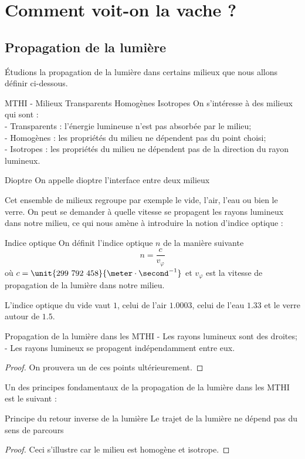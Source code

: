 \documentclass{cours}
\begin{document}
	\section{Comment voit-on la vache ?}
	\subsection{Propagation de la lumière}
	Étudions la propagation de la lumière dans certains milieux que nous allons définir ci-dessous.
	\begin{définition}{MTHI - Milieux Transparents Homogènes Isotropes}{}
	On s'intéresse à des milieux qui sont :\\
	- Transparents : l'énergie lumineuse n'est pas absorbée par le milieu;\\
	- Homogènes : les propriétés du milieu ne dépendent pas du point choisi;\\
	- Isotropes : les propriétés du milieu ne dépendent pas de la direction du rayon lumineux.
	\end{définition}
	\begin{définition}{Dioptre}{}
	On appelle dioptre l'interface entre deux milieux
	\end{définition}
	Cet ensemble de milieux regroupe par exemple le vide, l'air, l'eau ou bien le verre. On peut se demander à quelle vitesse se propagent les rayons lumineux dans notre milieu, ce qui nous amène à introduire la notion d'indice optique :
	\begin{définition}{Indice optique}{}
	On définit l'indice optique $n$ de la manière suivante
	$$n=\frac{c}{v_\varphi}$$
	où $c =\unit{299~792~458}{\meter\cdot\second^{-1}}$ et $v_\varphi$ est la vitesse de propagation de la lumière dans notre milieu.
	\end{définition}
	\begin{example}
		L'indice optique du vide vaut $1$, celui de l'air $1.0003$, celui de l'eau $1.33$ et le verre autour de $1.5$.
	\end{example}
	\begin{théorème}{Propagation de la lumière dans les MTHI}{}
	- Les rayons lumineux sont des droites;\\
	- Les rayons lumineux se propagent indépendamment entre eux.
	\end{théorème}
	\begin{proof}
	On prouvera un de ces points ultérieurement. 
	\end{proof}
	Un des principes fondamentaux de la propagation de la lumière dans les MTHI est le suivant :
	\begin{théorème}{Principe du retour inverse de la lumière}{}
	Le trajet de la lumière ne dépend pas du sens de parcours
	\end{théorème}
	\begin{proof}
	Ceci s'illustre car le milieu est homogène et isotrope.
	\end{proof}
\end{document}

